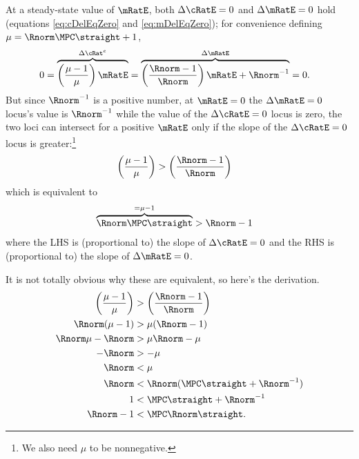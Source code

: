 \documentclass{\handout}
\begin{document}
At a steady-state value of $\mRatE$, both $\dcEqZero$ and $\dmEqZero$ hold (equations \eqref{eq:cDelEqZero} and \eqref{eq:mDelEqZero}); for convenience defining $\mu = \Rnorm \MPCU \straight + 1$, 
\begin{equation}\begin{gathered}\begin{aligned}
  0 = \overbrace{\left(\frac{\mu-1}{\mu}\right) \mRatE}^{\Delta {\cRat}^{e} } & =  \overbrace{\left(\frac{\Rnorm-1}{\Rnorm}\right)\mRatE + \Rnorm^{-1}}^{\Delta \mRatE} = 0.
\end{aligned}\end{gathered}\end{equation}
But since $\Rnorm^{-1}$ is a positive number, at $\mRatE=0$ the $\dmEqZero$ locus's value is $\Rnorm^{-1}$ while the value of the $\dcEqZero$ locus is zero, the two loci can intersect for a positive $\mRatE$ only if the slope of the $\dcEqZero$ locus is greater:\footnote{We also need $\mu$ to be nonnegative.}
\begin{equation}\begin{gathered}\begin{aligned}
  \left(\frac{\mu-1}{\mu}\right) & >  \left(\frac{\Rnorm-1}{\Rnorm}\right) \label{eq:cDelEq0SlopeCond}
\end{aligned}\end{gathered}\end{equation}
which is equivalent to 
\begin{equation}\begin{gathered}\begin{aligned}
  \overbrace{\Rnorm \MPCU \straight}^{= \mu-1} & >   \Rnorm-1  \label{eq:cDelEq0SlopeCondAlt}
\end{aligned}\end{gathered}\end{equation}
where the LHS is (proportional to) the slope of $\dcEqZero$ and the RHS is (proportional to) the slope of $\dmEqZero$.
\begin{CDCPrivate}

It is not totally obvious why these are equivalent, so here's the derivation.
\begin{equation}\begin{gathered}\begin{aligned}
  \left(\frac{\mu-1}{\mu}\right) & >  \left(\frac{\Rnorm-1}{\Rnorm}\right)
\\  \Rnorm (\mu-1) & >  \mu (\Rnorm-1)
\\  \Rnorm \mu - \Rnorm & >  \mu \Rnorm-\mu
\\  - \Rnorm & >  -\mu
\\   \Rnorm & <  \mu
\\   \Rnorm & <  \Rnorm(\MPCU \straight + \Rnorm^{-1}) \label{eq:mDelEq0vscDelEq0Slope}
\\   1 & <  \MPCU \straight + \Rnorm^{-1}
\\   \Rnorm-1 & <  \MPCU \Rnorm \straight
.
\end{aligned}\end{gathered}\end{equation}
\end{CDCPrivate}
\end{document}
